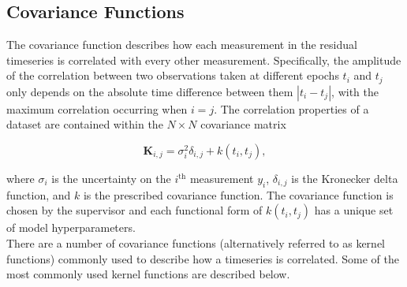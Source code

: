 \subsection{Covariance Functions} \label{sect:covariance}
The covariance function describes how each measurement in the residual 
timeseries is correlated with every other measurement. Specifically, 
the amplitude of the correlation between two observations taken at different 
epochs $t_i$ and $t_j$ only depends on the absolute time difference between 
them $|t_i-t_j|$, with the maximum correlation occurring when $i=j$. 
The correlation properties of a dataset are contained within the $N \times N$ 
covariance matrix 

\begin{equation}
\mathbf{K}_{i,j} = \sigma_i^2 \delta_{i,j} + k(t_i, t_j), \label{eq:Kmatrix}
\end{equation}

\noindent where $\sigma_i$ is the uncertainty on the $i^{\mathrm{th}}$ measurement 
$y_i$, $\delta_{i,j}$ is the Kronecker delta function, and $k$ is the prescribed 
covariance function. The covariance function is chosen by the supervisor and each 
functional form of $k(t_i,t_j)$ has a unique set of model hyperparameters. \\

There are a number of covariance functions (alternatively referred to as kernel 
functions) commonly used to describe how a timeseries is correlated. Some of the 
most commonly used kernel functions are described below.

